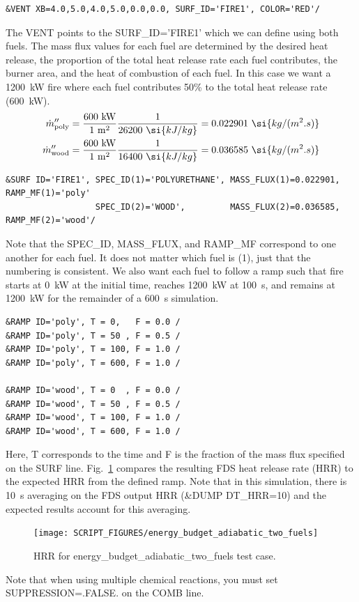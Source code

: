 \documentclass[11pt]{book}
\begin{document}
\begin{lstlisting}
&VENT XB=4.0,5.0,4.0,5.0,0.0,0.0, SURF_ID='FIRE1', COLOR='RED'/
\end{lstlisting}
The {\ct VENT} points to the {\ct SURF\_ID='FIRE1'} which we can define using both fuels. The mass flux values for each fuel are determined by the desired heat release, the proportion of the total heat release rate each fuel contributes, the burner area, and the heat of combustion of each fuel. In this case we want a 1200~kW fire where each fuel contributes 50\% to the total heat release rate (600~kW).
\begin{align}
\dot{m}''_{\rm poly} &= \frac{600~\mathrm{kW}}{1~\mathrm{m^2}}\frac{1}{26200~\si{kJ/kg}} = 0.022901~\si{kg/(m^2.s)}\\
\dot{m}''_{\rm wood} &= \frac{600~\mathrm{kW}}{1~\mathrm{m^2}}\frac{1}{16400~\si{kJ/kg}} = 0.036585~\si{kg/(m^2.s)}
\end{align}

\begin{lstlisting}
&SURF ID='FIRE1', SPEC_ID(1)='POLYURETHANE', MASS_FLUX(1)=0.022901, RAMP_MF(1)='poly'
                  SPEC_ID(2)='WOOD',         MASS_FLUX(2)=0.036585, RAMP_MF(2)='wood'/
\end{lstlisting}
Note that the {\ct SPEC\_ID}, {\ct MASS\_FLUX}, and {\ct RAMP\_MF} correspond to one another for each fuel. It does not matter which fuel is {\ct (1)}, just that the numbering is consistent. We also want each fuel to follow a ramp such that fire starts at 0~kW at the initial time, reaches 1200~kW at 100~s, and remains at 1200~kW for the remainder of a 600~s simulation.
\begin{lstlisting}
&RAMP ID='poly', T = 0,   F = 0.0 /
&RAMP ID='poly', T = 50 , F = 0.5 /
&RAMP ID='poly', T = 100, F = 1.0 /
&RAMP ID='poly', T = 600, F = 1.0 /

&RAMP ID='wood', T = 0  , F = 0.0 /
&RAMP ID='wood', T = 50 , F = 0.5 /
&RAMP ID='wood', T = 100, F = 1.0 /
&RAMP ID='wood', T = 600, F = 1.0 /
\end{lstlisting}
Here, {\ct T} corresponds to the time and {\ct F} is the fraction of the mass flux specified on the {\ct SURF} line. Fig.~\ref{fig:hrr_two_fuels} compares the resulting FDS heat release rate (HRR) to the expected HRR from the defined ramp. Note that in this simulation, there is 10~s averaging on the FDS output HRR ({\ct \&DUMP DT\_HRR=10}) and the expected results account for this averaging.

\begin{figure}[ht]
\centering
\texttt{[image: SCRIPT\_FIGURES/energy\_budget\_adiabatic\_two\_fuels]}
\caption[HRR for {\ct energy\_budget\_adiabatic\_two\_fuels} test case]{HRR for {\ct energy\_budget\_adiabatic\_two\_fuels} test case.}
\label{fig:hrr_two_fuels}
\end{figure}
Note that when using multiple chemical reactions, you must set {\ct SUPPRESSION=.FALSE.} on the {\ct COMB} line.
\end{document}
